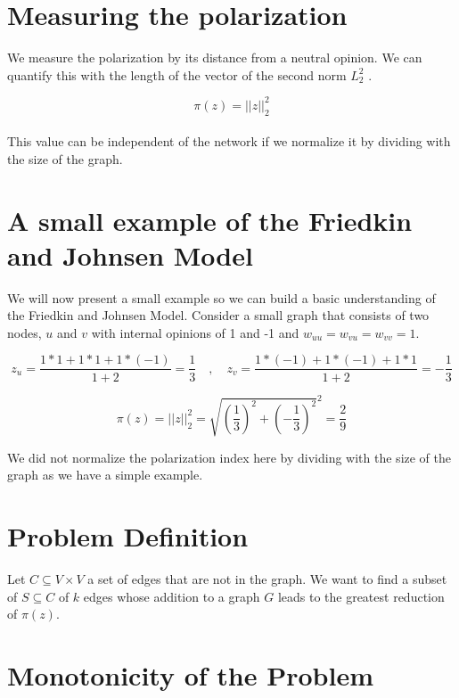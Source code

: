 \section{Measuring the polarization}
\label{sec:meas}

We measure the polarization by its distance from a neutral opinion. We can quantify this with the length of the vector of the second norm $L_{2}^2$ \cite{tsapMatakosTerzi}.

\begin{equation}
	\pi(z) = ||z||_{2}^2
\end{equation}
\\
This value can be independent of the network if we normalize it by dividing with the size of the graph.


\section{A small example of the Friedkin and Johnsen Model}
\label{sec:example}
We will now present a small example so we can build a basic understanding of the Friedkin and Johnsen Model. Consider a small graph that consists of two nodes, $u$ and $v$ with internal opinions of 1 and -1 and $w_{uu} = w_{vu} = w_{vv} = 1$.

\begin{equation} 
	 z_u = \frac{1*1 + 1*1 + 1*(-1)}{1 + 2} = \frac{1}{3} \quad, \quad
	 z_v = \frac{1*(-1) + 1*(-1) + 1*1}{1 + 2} = -\frac{1}{3}
\end{equation}

\begin{equation}
	\pi(z) = ||z||_{2}^2 = \sqrt{(\frac{1}{3})^2 + (-\frac{1}{3})^2}^2 = \frac{2}{9}			   
\end{equation}

We did not normalize the polarization index here by dividing with the size of the graph as we have a simple example.

\section{Problem Definition}
\label{sec:problemDef}

Let $C \subseteq	V \times V$ a set of edges that are not in the graph. We want to find a subset of $S \subseteq C$ of $k$ edges whose addition to a graph $G$ leads to the greatest reduction of $\pi(z)$.


\section{Monotonicity of the Problem}
\label{sec:monotonicity}

